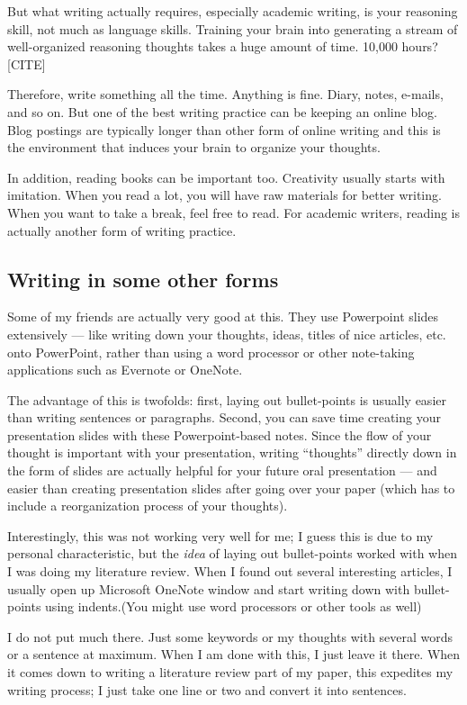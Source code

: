\documentclass[11pt]{article}
\begin{document}
But what writing actually requires, especially academic writing, is your
reasoning skill, not much as language skills. Training your brain into
generating a stream of well-organized reasoning thoughts takes a huge amount
of time. 10,000 hours? [CITE]

Therefore, write something all the time. Anything is fine. Diary, notes,
e-mails, and so on. But one of the best writing practice can be keeping an
online blog. Blog postings are typically longer than other form of online
writing and this is the environment that induces your brain to organize your
thoughts. 

In addition, reading books can be important too. Creativity usually starts
with imitation. When you read a lot, you will have raw materials for better
writing.  When you want to take a break, feel free to read. For academic
writers, reading is actually another form of writing practice.

\subsection{Writing in some other forms}
Some of my friends are actually very good at this. They use Powerpoint slides
extensively --- like writing down your thoughts, ideas, titles of nice articles,
etc. onto PowerPoint, rather than using a word processor or other note-taking
applications such as Evernote or OneNote.

The advantage of this is twofolds: first, laying out bullet-points is usually
easier than writing sentences or paragraphs. Second, you can save time
creating your presentation slides with these Powerpoint-based notes. Since the
flow of your thought is important with your presentation, writing ``thoughts''
directly down in the form of slides are actually helpful for your future oral
presentation --- and easier than creating presentation slides after going over
your paper (which has to include a reorganization process of your thoughts).

Interestingly, this was not working very well for me; I guess this is due to
my personal characteristic, but the \emph{idea} of laying out bullet-points
worked with when I was doing my literature review. When I found out several
interesting articles, I usually open up Microsoft OneNote window and start
writing down with bullet-points using indents.(You might use word processors
or other tools as well)

I do not put much there. Just some keywords or my thoughts with several words
or a sentence at maximum. When I am done with this, I just leave it there.
When it comes down to writing a literature review part of my paper, this
expedites my writing process; I just take one line or two and convert it into
sentences.
\end{document}
